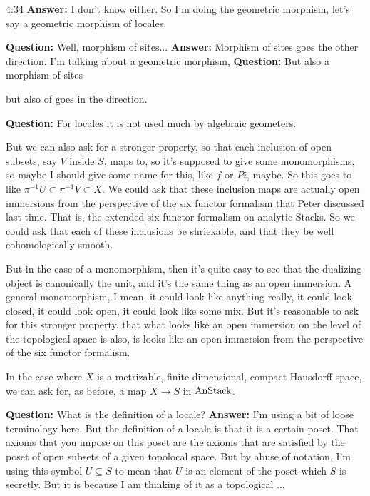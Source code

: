 \begin{unfinished}{4:34}
\textbf{Answer:} I don't know either. So I'm doing the geometric morphism, let's say a geometric morphism of locales. 

\textbf{Question:} Well, morphism of sites...
\textbf{Answer:} Morphism of sites goes the other direction. I'm talking about a geometric morphism, 
\textbf{Question:} But also a morphism of sites

but also of goes in the direction.

\textbf{Question:} For locales it is not used much by algebraic geometers.


But we can also ask for a stronger property, so that each inclusion of open subsets, say $V$ inside $S$, maps to, so it's supposed to give some monomorphisms, so maybe I should give some name for this, like $f$ or $Pi$, maybe. So this goes to like $\pi^{-1} U \subset \pi^{-1} V \subset X$. We could ask that these inclusion maps are actually open immersions from the perspective of the six functor formalism that Peter discussed last time. That is, the extended six functor formalism on analytic Stacks. So we could ask that each of these inclusions be shriekable, and that they be well cohomologically smooth.

But in the case of a monomorphism, then it's quite easy to see that the dualizing object is canonically the unit, and it's the same thing as an open immersion. A general monomorphism, I mean, it could look like anything really, it could look closed, it could look open, it could look like some mix. But it's reasonable to ask for this stronger property, that what looks like an open immersion on the level of the topological space is also, is looks like an open immersion from the perspective of the six functor formalism.

In the case where $X$ is a metrizable, finite dimensional, compact Hausdorff space, we can ask for, as before, a map $X \rightarrow S$ in $\text{AnStack}$.

\textbf{Question:} What is the definition of a locale?
\textbf{Answer:} I'm using a bit of loose terminology here. But the definition of a locale is that it is a certain poset. That axioms that you impose on this poset are the axioms that are satisfied by the poset of open subsets of a given topolocal space.
But by abuse of notation, I'm using this symbol $U \subseteq S$ to mean that $U$ is an element of the poset which $S$ is secretly. But it is because I am thinking of it as a topological ... 



\end{unfinished}
